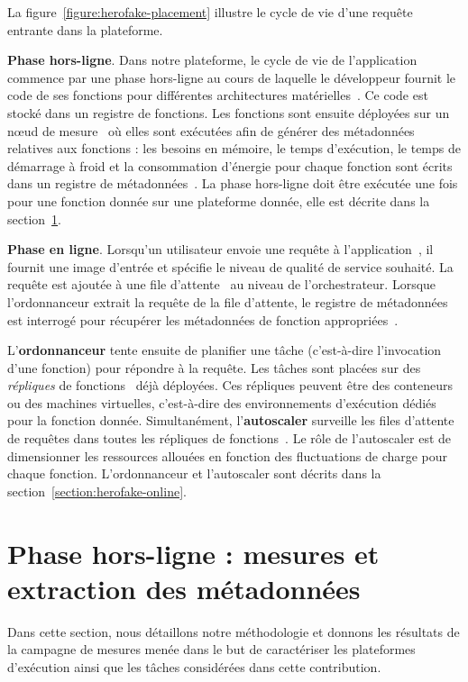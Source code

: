La figure~\ref{figure:herofake-placement} illustre le cycle de vie d'une requête entrante dans la plateforme.

\textbf{Phase hors-ligne}. Dans notre plateforme, le cycle de vie de l'application commence par une phase hors-ligne au cours de laquelle le développeur fournit le code de ses fonctions pour différentes architectures matérielles~. Ce code est stocké dans un registre de fonctions. Les fonctions sont ensuite déployées sur un nœud de mesure~ où elles sont exécutées afin de générer des métadonnées relatives aux fonctions : les besoins en mémoire, le temps d'exécution, le temps de démarrage à froid et la consommation d'énergie pour chaque fonction sont écrits dans un registre de métadonnées~. La phase hors-ligne doit être exécutée une fois pour une fonction donnée sur une plateforme donnée, elle est décrite dans la section~\ref{section:herofake-offline}.

\textbf{Phase en ligne}. Lorsqu'un utilisateur envoie une requête à l'application~, il fournit une image d'entrée et spécifie le niveau de qualité de service souhaité. La requête est ajoutée à une file d'attente~ au niveau de l'orchestrateur. Lorsque l'ordonnanceur extrait la requête de la file d'attente, le registre de métadonnées est interrogé pour récupérer les métadonnées de fonction appropriées~.

L'\textbf{ordonnanceur} tente ensuite de planifier une tâche (c'est-à-dire l'invocation d'une fonction) pour répondre à la requête. Les tâches sont placées sur des \textit{répliques} de fonctions~ déjà déployées. Ces répliques peuvent être des conteneurs ou des machines virtuelles, c'est-à-dire des environnements d'exécution dédiés pour la fonction donnée. Simultanément, l'\textbf{autoscaler} surveille les files d'attente de requêtes dans toutes les répliques de fonctions~. Le rôle de l'autoscaler est de dimensionner les ressources allouées en fonction des fluctuations de charge pour chaque fonction. L'ordonnanceur et l'autoscaler sont décrits dans la section~\ref{section:herofake-online}.

\section{Phase hors-ligne : mesures et extraction des métadonnées}
\label{section:herofake-offline}

Dans cette section, nous détaillons notre méthodologie et donnons les résultats de la campagne de mesures menée dans le but de caractériser les plateformes d'exécution ainsi que les tâches considérées dans cette contribution.

